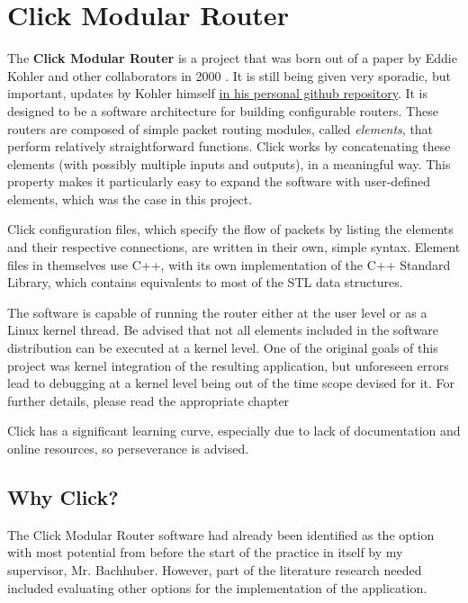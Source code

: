 \chapter{Click Modular Router}
\thispagestyle{empty}

The \textbf{Click Modular Router} is a project that was born out of a paper by Eddie Kohler and other collaborators in 2000 \cite{Kohler2000}. It is still being given very sporadic, but important, updates by Kohler himself \href{https://github.com/kohler/click}{in his personal github repository}. It is designed to be a software architecture for building configurable routers. These routers are composed of simple packet routing modules, called \textit{elements}, that perform relatively straightforward functions. Click works by concatenating these elements (with possibly multiple inputs and outputs), in a meaningful way. This property makes it particularly easy to expand the software with user-defined elements, which was the case in this project.

Click configuration files, which specify the flow of packets by listing the elements and their respective connections, are written in their own, simple syntax. Element files in themselves use C++, with its own implementation of the C++ Standard Library, which contains equivalents to most of the STL data structures. 

The software is capable of running the router either at the user level or as a Linux kernel thread. Be advised that not all elements included in the software distribution can be executed at a kernel level. One of the original goals of this project was kernel integration of the resulting application, but unforeseen errors lead to debugging at a kernel level being out of the time scope devised for it. For further details, please read the appropriate chapter

Click has a significant learning curve, especially due to lack of documentation and online resources, so perseverance is advised.

\section{Why Click?}

The Click Modular Router software had already been identified as the option with most potential from before the start of the practice in itself by my supervisor, Mr. Bachhuber. However, part of the literature research needed included evaluating other options for the implementation of the application.

